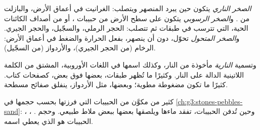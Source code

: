 \begin{definition}\label{def:g6:rocks-and-minerals:rock-families}
\emph{الصخر الناري} يتكون حين يبرد  المنصهر
ويتصلب: الغرانيت في أعماق الأرض، والبازلت من .
و\emph{الصخر الرسوبي} يتكون على سطح الأرض من حبيبات
 ، أو من أصداف الكائنات الحية، التي تترسب في طبقات ثم
تتصلب: الحجر الرملي، والسجّيل، والحجر الجيري.
و\emph{الصخر المتحول}  تحوّل، دون أن ينصهر، بفعل
الحرارة والضغط في أعماق الأرض: الرخام (من الحجر الجيري)، والأردواز (من
السجّيل).
\end{definition}

وتسمية \emph{النارية} مأخوذة من النار، وكذلك اسمها في اللغات الأوروبية،
المشتق من الكلمة اللاتينية الدالة على النار. وكثيرًا ما تُظهر  طبقات، بعضها
فوق بعض، كصفحات كتاب.  كثيرًا ما تكون مضغوطة مطوية؛
وبعضها، مثل الأردواز، ينفلق صفائح مسطحة.

كثير من  مكوَّن من الحبيبات التي فرزتها بحسب حجمها في
\cref{ch:g3:stones-pebbles-sand}:  ، ، . وحين
تُدفن الحبيبات، تفقد ماءها ويلصقها بعضها ببعض ملاط طبيعي. وحجم الحبيبات
هو الذي يعطي  اسمه.

